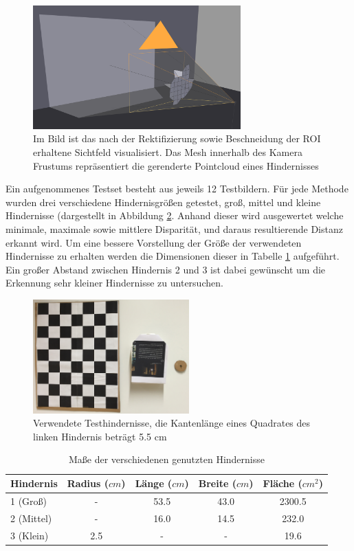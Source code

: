 	\begin{figure}[h]
		\centering
		\includegraphics[width=8cm]{img/viewport}
		\caption{Im Bild ist das nach der Rektifizierung sowie Beschneidung der ROI erhaltene Sichtfeld visualisiert. Das Mesh innerhalb des Kamera Frustums repräsentiert die gerenderte Pointcloud eines Hindernisses}
		\label{fig:field_of_view}
	\end{figure}

\noindent
Ein aufgenommenes Testset besteht aus jeweils 12 Testbildern. Für jede Methode wurden drei verschiedene Hindernisgrößen getestet, groß, mittel und kleine Hindernisse (dargestellt in Abbildung \ref{fig:test_obstacles}. Anhand dieser wird ausgewertet welche minimale, maximale sowie mittlere Disparität, und daraus resultierende Distanz erkannt wird. Um eine bessere Vorstellung der Größe der verwendeten Hindernisse zu erhalten werden die Dimensionen dieser in Tabelle \ref{tbl:obstacle_sizes} aufgeführt. Ein großer Abstand zwischen Hindernis 2 und 3 ist dabei gewünscht um die Erkennung sehr kleiner Hindernisse zu untersuchen. \\

\begin{figure}[h]
	\centering
	\includegraphics[width=6cm]{img/test_obstacles}
	\caption{Verwendete Testhindernisse, die Kantenlänge eines Quadrates des linken Hindernis beträgt 5.5 cm}
	\label{fig:test_obstacles}
\end{figure}

\begin{table}[h]
\centering
\begin{tabular}{|l|c|c|c|c|}
\hline
Hindernis   & Radius ($cm$) & Länge ($cm$)& Breite ($cm$)& Fläche ($cm^2$)\\
\hline
1 (Groß)   	&   -    & 53.5  & 43.0   & 2300.5 \\
\hline
2 (Mittel) 	& 	-    & 16.0  & 14.5   & 232.0\\
\hline
3 (Klein)	&  2.5	 &   -   &   -    & 19.6 \\
\hline	
\end{tabular}
\caption{Maße der verschiedenen genutzten Hindernisse}
\label{tbl:obstacle_sizes}
\end{table}

